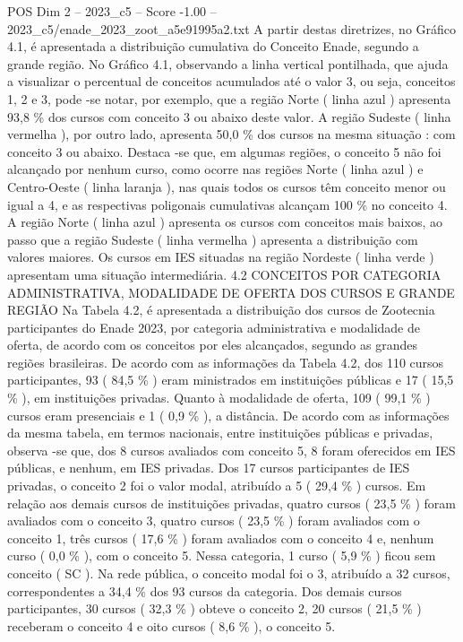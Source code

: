 \begin{textsample}{POS Dim 2 – 2023\_c5 – Score -1.00 – 2023\_c5/enade\_2023\_zoot\_a5e91995a2.txt}
A partir destas diretrizes, no Gráfico 4.1, é apresentada a distribuição cumulativa do Conceito Enade, segundo a grande região.
No Gráfico 4.1, observando a linha vertical pontilhada, que ajuda a visualizar o percentual de conceitos acumulados até o valor 3, ou seja, conceitos 1, 2 e 3, pode -se notar, por exemplo, que a região Norte ( linha azul ) apresenta 93,8 \% dos cursos com conceito 3 ou abaixo deste valor.
A região Sudeste ( linha vermelha ), por outro lado, apresenta 50,0 \% dos cursos na mesma situação : com conceito 3 ou abaixo.
Destaca -se que, em algumas regiões, o conceito 5 não foi alcançado por nenhum curso, como ocorre nas regiões Norte ( linha azul ) e Centro-Oeste ( linha laranja ), nas quais todos os cursos têm conceito menor ou igual a 4, e as respectivas poligonais cumulativas alcançam 100 \% no conceito 4.
A região Norte ( linha azul ) apresenta os cursos com conceitos mais baixos, ao passo que a região Sudeste ( linha vermelha ) apresenta a distribuição com valores maiores.
Os cursos em IES situadas na região Nordeste ( linha verde ) apresentam uma situação intermediária. 4.2 CONCEITOS POR CATEGORIA ADMINISTRATIVA, MODALIDADE DE OFERTA DOS CURSOS E GRANDE REGIÃO Na Tabela 4.2, é apresentada a distribuição dos cursos de Zootecnia participantes do Enade 2023, por categoria administrativa e modalidade de oferta, de acordo com os conceitos por eles alcançados, segundo as grandes regiões brasileiras.
De acordo com as informações da Tabela 4.2, dos 110 cursos participantes, 93 ( 84,5 \% ) eram ministrados em instituições públicas e 17 ( 15,5 \% ), em instituições privadas.
Quanto à modalidade de oferta, 109 ( 99,1 \% ) cursos eram presenciais e 1 ( 0,9 \% ), a distância.
De acordo com as informações da mesma tabela, em termos nacionais, entre instituições públicas e privadas, observa -se que, dos 8 cursos avaliados com conceito 5, 8 foram oferecidos em IES públicas, e nenhum, em IES privadas.
Dos 17 cursos participantes de IES privadas, o conceito 2 foi o valor modal, atribuído a 5 ( 29,4 \% ) cursos.
Em relação aos demais cursos de instituições privadas, quatro cursos ( 23,5 \% ) foram avaliados com o conceito 3, quatro cursos ( 23,5 \% ) foram avaliados com o conceito 1, três cursos ( 17,6 \% ) foram avaliados com o conceito 4 e, nenhum curso ( 0,0 \% ), com o conceito 5.
Nessa categoria, 1 curso ( 5,9 \% ) ficou sem conceito ( SC ).
Na rede pública, o conceito modal foi o 3, atribuído a 32 cursos, correspondentes a 34,4 \% dos 93 cursos da categoria.
Dos demais cursos participantes, 30 cursos ( 32,3 \% ) obteve o conceito 2, 20 cursos ( 21,5 \% ) receberam o conceito 4 e oito cursos ( 8,6 \% ), o conceito 5.

\end{textsample}
